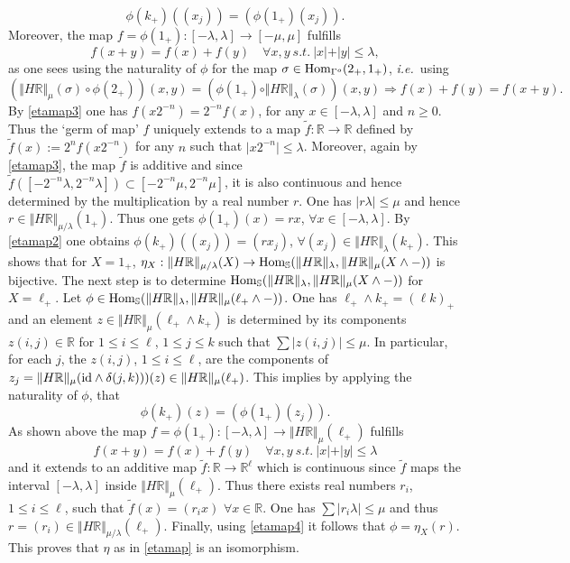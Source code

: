 \documentclass[cupthm]{CUP-JNL-JMJ}
\numberwithin{equation}{section}
\theoremstyle{cupplain}
\theoremstyle{cupdefinition}
\theoremstyle{cupremark}
\theoremstyle{cupproof}
\def\R{{\mathbb R}}
\def\S{{\mathbb S}}
\def\sss{{\S}}
\def\Hom {{\rm{Hom}}}
\def\id{{\rm id}}
\def\gop{{\Gamma^{o}}}
\newcommand{\ie}{{\it i.e.\/}\ }
\begin{document}
\begin{equation}\label{etamap2}
	\phi(k_+)((x_j))=\left(\phi(1_+)(x_j)\right).
\end{equation}
Moreover, the map $f=\phi(1_+):[-\lambda,\lambda]\to [-\mu, \mu]$  fulfills 
\begin{equation}\label{etamap3}
	f(x+y)=f(x)+f(y)\quad\forall x,y\  s. t. \ \vert x\vert +\vert y\vert \leq \lambda, 
\end{equation}
as one sees using the naturality of $\phi$ for the map $\sigma\in \Hom_\gop(2_+,1_+)$, \ie using 
\[
(\Vert H\R\Vert_\mu(\sigma)\circ \phi(2_+))(x,y)=(\phi(1_+)\circ \Vert H\R\Vert_\lambda(\sigma))(x,y)\Longrightarrow f(x)+f(y)=f(x+y).
\]
By \eqref{etamap3} one has $f(x 2^{-n})= 2^{-n} f(x)$, for any $x\in [-\lambda,\lambda]$ and $n\geq 0$. Thus the `germ of map' $f$ uniquely extends to a map $\tilde f:\R\to \R$ defined by $\tilde f(x):=2^n f(x 2^{-n})$ for any $n$ such that $\vert x 2^{-n}\vert \leq \lambda$. Moreover, again by \eqref{etamap3}, the map $\tilde f$ is additive and since $\tilde f([-2^{-n}\lambda,2^{-n}\lambda])\subset [-2^{-n}\mu,2^{-n}\mu]$, it is also continuous and hence determined by the multiplication by a real number $r$. One has $\vert r \lambda \vert \leq \mu$ and hence $r\in \Vert H\R\Vert_{\mu/\lambda}(1_+)$. Thus one gets $\phi(1_+)(x)=r x$, $\forall x \in [-\lambda,\lambda]$. By  \eqref{etamap2} one obtains $\phi(k_+)((x_j))=(r x_j)$, $\forall (x_j)\in \Vert H\R\Vert_\lambda(k_+)$. This shows that for $X=1_+$, $\eta_X:\Vert H\R\Vert_{\mu/\lambda}(X)\to \Hom_\sss(\Vert H\R\Vert_\lambda,\Vert H\R\Vert_\mu( X\wedge -))$ is bijective. The next step is to determine $\Hom_\sss(\Vert H\R\Vert_\lambda,\Vert H\R\Vert_\mu( X\wedge -))$ for $X=\ell_+$. Let $\phi \in \Hom_\sss(\Vert H\R\Vert_\lambda,\Vert H\R\Vert_\mu( \ell_+\wedge -))$. One has $\ell_+\wedge k_+=(\ell k)_+$ and an element 
$z\in \Vert H\R\Vert_\mu( \ell_+\wedge k_+)$ is determined by its components $z(i,j)\in \R$ for $1\leq i\leq \ell$, $1\leq j\leq k$ such that $\sum \vert z(i,j)\vert \leq \mu$. In particular, for each $j$, the $z(i,j)$, $1\leq i\leq \ell$, are the components of $z_j=\Vert H\R\Vert_\mu( \id\wedge \delta(j,k)))(z)\in \Vert H\R\Vert_\mu(\ell_+)$. This implies by applying the naturality of $\phi$,  that  
\begin{equation}\label{etamap4}
	\phi(k_+)(z)=\left(\phi(1_+)(z_j)\right).
\end{equation}
As shown above the map $f=\phi(1_+):[-\lambda,\lambda]\to \Vert H\R\Vert_\mu(\ell_+)$  fulfills 
\begin{equation}\label{etamap5}
	f(x+y)=f(x)+f(y)\quad\forall x,y\  s. t. \ \vert x\vert +\vert y\vert \leq \lambda 
\end{equation}
and it extends to an additive map $\tilde f: \R \to \R^\ell$ which is continuous since $\tilde f$ maps the interval $[-\lambda,\lambda]$ inside $\Vert H\R\Vert_\mu(\ell_+)$. Thus there exists 
real numbers  $r_i$, $1\leq i\leq \ell$, such that $\tilde f(x)=(r_i x)$ $\forall x\in \R$. One has $\sum \vert r_i \lambda  \vert \leq \mu$ and thus $r=(r_i)\in \Vert H\R\Vert_{\mu/\lambda}(\ell_+)$. Finally, using \eqref{etamap4} it follows that $\phi=\eta_X(r)$. This proves that  $\eta$ as in \eqref{etamap} is an isomorphism.\endproof  
\end{document}

